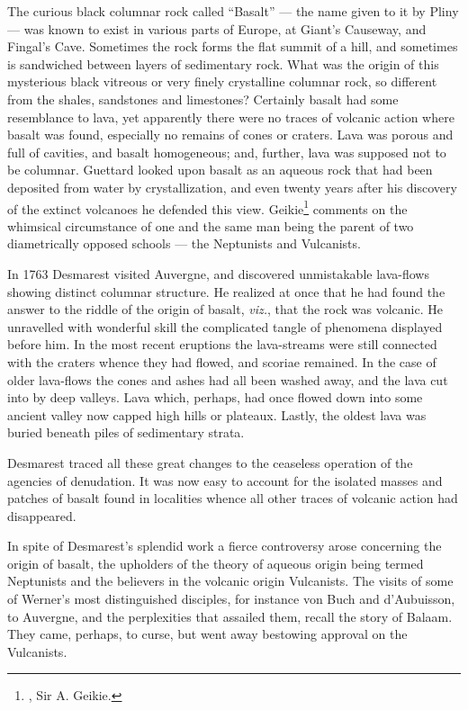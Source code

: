 \documentclass[a4paper, 12pt, oneside]{article}
\begin{document}
The curious black columnar rock called ``Basalt'' --- the name given to it by Pliny --- was known to exist in various parts of Europe, at Giant's Causeway, and Fingal's Cave. Sometimes the rock forms the flat summit of a hill, and sometimes is sandwiched between layers of sedimentary rock. What was the origin of this mysterious black vitreous or very finely crystalline columnar rock, so different from the shales, sandstones and limestones? Certainly basalt had some resemblance to lava, yet apparently there were no traces of volcanic action where basalt was found, especially no remains of cones or craters. Lava was porous and full of cavities, and basalt homogeneous; and, further, lava was supposed not to be columnar. Guettard looked upon basalt as an aqueous rock that had been deposited from water by crystallization, and even twenty years after his discovery of the extinct volcanoes he defended this view. Geikie\footnote{, Sir A. Geikie.} comments on the whimsical circumstance of one and the same man being the parent of two diametrically opposed schools --- the Neptunists and Vulcanists.

In 1763 Desmarest visited Auvergne, and discovered unmistakable lava-flows showing distinct columnar structure. He realized at once that he had found the answer to the riddle of the origin of basalt, \emph{viz.}, that the rock was volcanic. He unravelled with wonderful skill the complicated tangle of phenomena displayed before him. In the most recent eruptions the lava-streams were still connected with the craters whence they had flowed, and scoriae remained. In the case of older lava-flows the cones and ashes had all been washed away, and the lava cut into by deep valleys. Lava which, perhaps, had once flowed down into some ancient valley now capped high hills or plateaux. Lastly, the oldest lava was buried beneath piles of sedimentary strata.

Desmarest traced all these great changes to the ceaseless operation of the agencies of denudation. It was now easy to account for the isolated masses and patches of basalt found in localities whence all other traces of volcanic action had disappeared.

In spite of Desmarest's splendid work a fierce controversy arose concerning the origin of basalt, the upholders of the theory of aqueous origin being termed Neptunists and the believers in the volcanic origin Vulcanists. The visits of some of Werner's most distinguished disciples, for instance von Buch and d'Aubuisson, to Auvergne, and the perplexities that assailed them, recall the story of Balaam. They came, perhaps, to curse, but went away bestowing approval on the Vulcanists.
\end{document}
